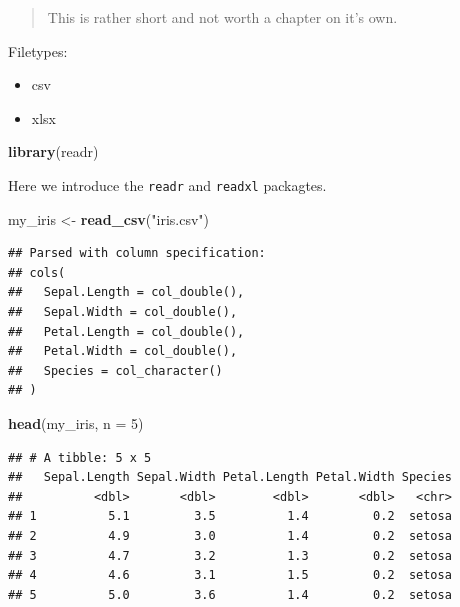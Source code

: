\documentclass[]{book}
\newenvironment{Shaded}{\begin{snugshade}}{\end{snugshade}}
\newcommand{\KeywordTok}[1]{\textcolor[rgb]{0.13,0.29,0.53}{\textbf{#1}}}
\newcommand{\DataTypeTok}[1]{\textcolor[rgb]{0.13,0.29,0.53}{#1}}
\newcommand{\DecValTok}[1]{\textcolor[rgb]{0.00,0.00,0.81}{#1}}
\newcommand{\StringTok}[1]{\textcolor[rgb]{0.31,0.60,0.02}{#1}}
\newcommand{\NormalTok}[1]{#1}
\providecommand{\tightlist}{%
  \setlength{\itemsep}{0pt}\setlength{\parskip}{0pt}}
\theoremstyle{definition}
\theoremstyle{definition}
\theoremstyle{definition}
\theoremstyle{remark}
\begin{document}
\begin{quote}
This is rather short and not worth a chapter on it's own.
\end{quote}

Filetypes:

\begin{itemize}
\tightlist
\item
  csv
\item
  xlsx
\end{itemize}

\begin{Shaded}
\begin{Highlighting}[]
\KeywordTok{library}\NormalTok{(readr)}
\end{Highlighting}
\end{Shaded}

Here we introduce the \texttt{readr} and \texttt{readxl} packagtes.

\begin{Shaded}
\begin{Highlighting}[]
\NormalTok{my_iris <-}\StringTok{ }\KeywordTok{read_csv}\NormalTok{(}\StringTok{"iris.csv"}\NormalTok{)}
\end{Highlighting}
\end{Shaded}

\begin{verbatim}
## Parsed with column specification:
## cols(
##   Sepal.Length = col_double(),
##   Sepal.Width = col_double(),
##   Petal.Length = col_double(),
##   Petal.Width = col_double(),
##   Species = col_character()
## )
\end{verbatim}

\begin{Shaded}
\begin{Highlighting}[]
\KeywordTok{head}\NormalTok{(my_iris, }\DataTypeTok{n =} \DecValTok{5}\NormalTok{)}
\end{Highlighting}
\end{Shaded}

\begin{verbatim}
## # A tibble: 5 x 5
##   Sepal.Length Sepal.Width Petal.Length Petal.Width Species
##          <dbl>       <dbl>        <dbl>       <dbl>   <chr>
## 1          5.1         3.5          1.4         0.2  setosa
## 2          4.9         3.0          1.4         0.2  setosa
## 3          4.7         3.2          1.3         0.2  setosa
## 4          4.6         3.1          1.5         0.2  setosa
## 5          5.0         3.6          1.4         0.2  setosa
\end{verbatim}
\end{document}
